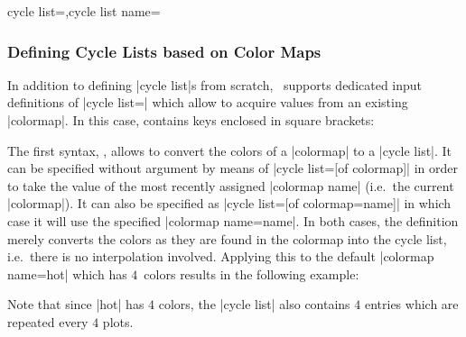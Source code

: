 \begin{pgfplotskeylist}{cycle list=,cycle list name=}
\subsubsection{Defining Cycle Lists based on Color Maps}
In addition to defining |cycle list|s from scratch, \PGFPlots\ supports dedicated input definitions of |cycle list=| which allow to acquire values from an existing |colormap|. In this case,  contains keys enclosed in square brackets:

{%


The first syntax, , allows to convert the colors of a |colormap| to a |cycle list|. It can be specified without argument by means of |cycle list={[of colormap]}| in order to take the value of the most recently assigned |colormap name| (i.e.\ the current |colormap|). It can also be specified as |cycle list={[of colormap=name]}| in which case it will use the specified |colormap name=name|. In both cases, the definition merely converts the colors as they are found in the colormap into the cycle list, i.e.\ there is no interpolation involved. Applying this to the default |colormap name=hot| which has $4$~colors results in the following example:
\begin{codeexample}[]
\end{codeexample}
Note that since |hot| has $4$ colors, the |cycle list| also contains $4$ entries which are repeated every $4$ plots.

}
\end{pgfplotskeylist}

